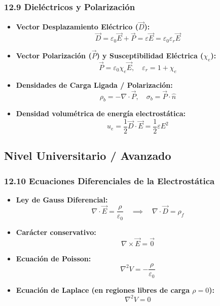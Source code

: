 \documentclass[11pt,a4paper]{article}
\begin{document}
\subsubsection*{12.9 Dieléctricos y Polarización}

\begin{itemize}
  \item \textbf{Vector Desplazamiento Eléctrico ($\vec{D}$):}
  \[
    \vec{D} = \varepsilon_0 \vec{E} + \vec{P} = \varepsilon \vec{E} = \varepsilon_0 \varepsilon_r \vec{E}
  \]
  \item \textbf{Vector Polarización ($\vec{P}$) y Susceptibilidad Eléctrica ($\chi_e$):}
  \[
    \vec{P} = \varepsilon_0 \chi_e \vec{E}, \quad \varepsilon_r = 1 + \chi_e
  \]
  \item \textbf{Densidades de Carga Ligada / Polarización:}
  \[
    \rho_b = -\nabla \cdot \vec{P}, \quad \sigma_b = \vec{P} \cdot \hat{n}
  \]
  \item \textbf{Densidad volumétrica de energía electrostática:}
  \[
    u_e = \frac{1}{2} \vec{D} \cdot \vec{E} = \frac{1}{2} \varepsilon E^2
  \]
\end{itemize}

\subsection*{Nivel Universitario / Avanzado}

\subsubsection*{12.10 Ecuaciones Diferenciales de la Electrostática}

\begin{itemize}
  \item \textbf{Ley de Gauss Diferencial:}
  \[
    \nabla \cdot \vec{E} = \frac{\rho}{\varepsilon_0} \quad \implies \quad \nabla \cdot \vec{D} = \rho_f
  \]
  \item \textbf{Carácter conservativo:}
  \[
    \nabla \times \vec{E} = \vec{0}
  \]
  \item \textbf{Ecuación de Poisson:}
  \[
    \nabla^2 V = -\frac{\rho}{\varepsilon_0}
  \]
  \item \textbf{Ecuación de Laplace (en regiones libres de carga $\rho = 0$):}
  \[
    \nabla^2 V = 0
  \]
\end{itemize}
\end{document}
